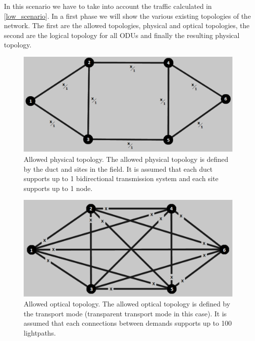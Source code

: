 In this scenario we have to take into account the traffic calculated in \ref{low_scenario}. In a first phase we will show the various existing topologies of the network. The first are the allowed topologies, physical and optical topologies, the second are the logical topology for all ODUs and finally the resulting physical topology.\\

\begin{figure}[H]
\centering
\includegraphics[width=13cm]{sdf/heuristic/transparent/figures/allowed_physical}
\caption{Allowed physical topology. The allowed physical topology is defined by the duct and sites in the field. It is assumed that each duct supports up to 1 bidirectional transmission system and each site supports up to 1 node.}
\label{allowed_physical_surv_ref_low_heuristic_transparent}
\end{figure}

\begin{figure}[H]
\centering
\includegraphics[width=13cm]{sdf/heuristic/transparent/figures/allowed_optical}
\caption{Allowed optical topology. The allowed optical topology is defined by the transport mode (transparent transport mode in this case). It is assumed that each connections between demands supports up to 100 lightpaths.}
\label{allowed_optical_surv_ref_low_heuristic_transparent}
\end{figure}

